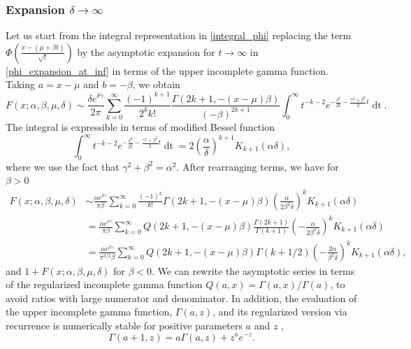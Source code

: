 \documentclass[10pt,a4paper,oneside]{article}
\numberwithin{equation}{section}
\begin{document}
\subsubsection{Expansion $\delta \to \infty$}
Let us start from the integral representation in \eqref{integral_phi} replacing the term $\Phi\left(\frac{x-(\mu + \beta t)}{\sqrt{t}}\right)$ by the asymptotic expansion for $t\to \infty$ in \eqref{phi_expansion_at_inf} in terms of the upper incomplete gamma function. Taking $a = x -\mu$ and $b = -\beta$, we obtain
\begin{equation}
F(x; \alpha, \beta, \mu, \delta) \sim \frac{\delta e^{\delta \gamma}}{2\pi} \sum_{k=0}^{\infty}\frac{(-1)^{k+1}}{2^k k!} \frac{\Gamma(2k+1, -(x-\mu)\beta)}{(-\beta)^{2k+1}} \int_0^{\infty} t^{-k-2} e^{-\frac{\delta^2}{2t} - \frac{\gamma^2 + \beta^2}{2}t} \mathop{dt}.
\end{equation}
The integral is expressible in terms of modified Bessel function
\begin{equation}
\int_0^{\infty} t^{-k-2} e^{-\frac{\delta^2}{2t} - \frac{\gamma^2 + \beta^2}{2}t} \mathop{dt} = 2 \left(\frac{\alpha}{\delta}\right)^{k + 1} K_{k+1}(\alpha \delta),
\end{equation}
where we use the fact that $\gamma^2+ \beta^2 = \alpha^2$. After rearranging terms, we have for $\beta > 0$
\begin{align}\label{general_asymptotic_delta}
F(x; \alpha, \beta, \mu, \delta) &\sim \frac{\alpha e^{\delta \gamma}}{\pi \beta}\sum_{k=0}^{\infty} \frac{(-1)^k}{k!} \Gamma(2k + 1, -(x-\mu)\beta)\left(\frac{\alpha}{2\beta^2 \delta}\right)^k K_{k+1}(\alpha \delta)\nonumber\\
 &=\frac{\alpha e^{\delta \gamma}}{\pi \beta}\sum_{k=0}^{\infty} Q(2k + 1, -(x-\mu)\beta)\frac{\Gamma(2k+1)}{\Gamma(k+1)}\left(-\frac{\alpha}{2\beta^2 \delta}\right)^k K_{k+1}(\alpha \delta)\nonumber\\
 &=\frac{\alpha e^{\delta \gamma}}{\pi^{3/2} \beta}\sum_{k=0}^{\infty} Q(2k + 1, -(x-\mu)\beta) \Gamma(k + 1/2)\left(-\frac{2\alpha}{\beta^2 \delta}\right)^k K_{k+1}(\alpha \delta),
\end{align}
and $1 + F(x; \alpha, \beta, \mu, \delta)$ for $\beta < 0$. We can rewrite the asymptotic series in terms of the regularized incomplete gamma function $Q(a, x) = \Gamma(a, x)/\Gamma(a)$, to avoid ratios with large numerator and denominator. In addition, the evaluation of the upper incomplete gamma function, $\Gamma(a, z)$, and its regularized version via recurrence is numerically stable for positive parameters $a$ and $z$ \cite{Temme1996},
\begin{equation}
\Gamma(a + 1, z) = a \Gamma(a, z) + z^a e^{-z}.
\end{equation}
\end{document}
